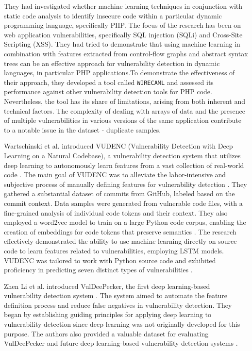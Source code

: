 \documentclass[journal,a4paper]{IEEEtran}
\begin{document}
They had investigated whether machine learning techniques in conjunction with static code analysis to identify insecure code within a particular dynamic programming language, specifically PHP. The focus of the research has been on web application vulnerabilities, specifically SQL injection (SQLi) and Cross-Site Scripting (XSS). They had tried to demonstrate that using machine learning in combination with features extracted from control-flow graphs and abstract syntax trees can be an effective approach for vulnerability detection in dynamic languages, in particular PHP applications.To demonstrate the effectiveness of their approach, they developed a tool called \texttt{WIRECAML} and assessed its performance against other vulnerability detection tools for PHP code. Nevertheless, the tool has its share of limitations, arising from both inherent and technical factors. The complexity of dealing with arrays of data and the presence of multiple vulnerabilities in various versions of the same application contribute to a notable issue in the dataset - duplicate samples.


Wartschinski et al. introduced VUDENC (Vulnerability Detection with Deep Learning on a Natural Codebase), a vulnerability detection system that utilizes deep learning to autonomously learn features from a vast collection of real-world code \cite{Wartschinski2019}. The main goal of VUDENC was to alleviate the labor-intensive and subjective process of manually defining features for vulnerability detection \cite{Wartschinski2019}. They gathered a substantial dataset of commits from GitHub, labeled based on the commit context. Data samples were generated from vulnerable code files, with a fine-grained analysis of individual code tokens and their context. They also employed a word2vec model to train on a large Python code corpus, enabling the creation of embeddings for code tokens that preserve semantics \cite{Wartschinski2019}.
The research effectively demonstrated the ability to use machine learning directly on source code to learn features related to vulnerabilities, employing LSTM models. VUDENC was tailored to work with Python source code and exhibited proficiency in predicting seven distinct types of vulnerabilities \cite{Wartschinski2019}.

Zhen Li et al. introduced VulDeePecker, the first deep learning-based vulnerability detection system \cite{Zhen_Li2018}. The system aimed to automate the feature definition process and reduce false negatives in vulnerability detection. They began by establishing guiding principles for applying deep learning to vulnerability detection since deep learning was not originally developed for this purpose. The authors also provided a valuable dataset for evaluating VulDeePecker and future deep learning-based vulnerability detection systems \cite{Zhen_Li2018}.
\end{document}
